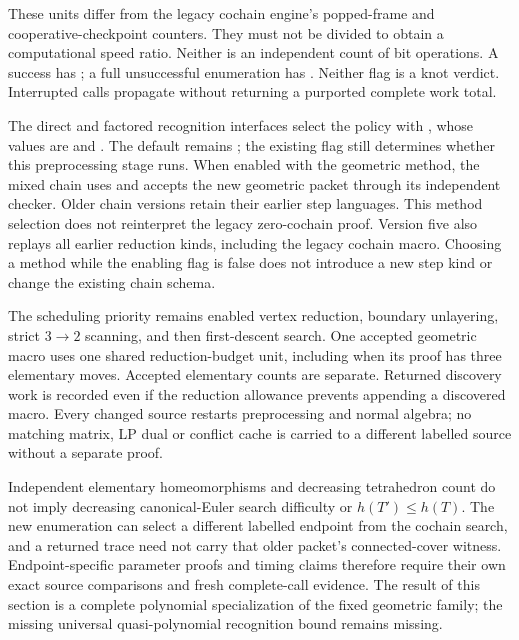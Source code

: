 These units differ from the legacy cochain engine's popped-frame and
cooperative-checkpoint counters.  They must not be divided to obtain
a computational speed ratio.  Neither is an independent count of
bit operations.  A success has ; a full
unsuccessful enumeration has .  Neither
flag is a knot verdict.  Interrupted calls propagate without returning
a purported complete work total.

The direct and factored recognition interfaces select the policy with
, whose values are  and
.  The default remains ; the existing
 flag still determines whether this
preprocessing stage runs.  When enabled with the geometric method,
the mixed chain uses  and accepts the new
geometric packet through its independent checker.  Older chain
versions retain their earlier step languages.  This method selection
does not reinterpret the legacy zero-cochain proof.
Version five also replays all earlier reduction kinds, including the
legacy cochain macro.  Choosing a method while the enabling flag is
false does not introduce a new step kind or change the existing chain
schema.

The scheduling priority remains enabled vertex reduction, boundary
unlayering, strict $3\to2$ scanning, and then first-descent search.
One accepted geometric macro uses one shared reduction-budget unit,
including when its proof has three elementary moves.  Accepted
elementary counts are separate.  Returned discovery work is recorded
even if the reduction allowance prevents appending a discovered macro.
Every changed source restarts preprocessing and normal algebra; no
matching matrix, LP dual or conflict cache is carried to a different
labelled source without a separate proof.

Independent elementary homeomorphisms and decreasing tetrahedron
count do not imply decreasing canonical-Euler search difficulty or
$h(T')\le h(T)$.  The new enumeration can select a different labelled
endpoint from the cochain search, and a returned trace need not carry
that older packet's connected-cover witness.  Endpoint-specific
parameter proofs and timing claims therefore require their own exact
source comparisons and fresh complete-call evidence.  The result of
this section is a complete polynomial specialization of the fixed
geometric family; the missing universal quasi-polynomial recognition
bound remains missing.

